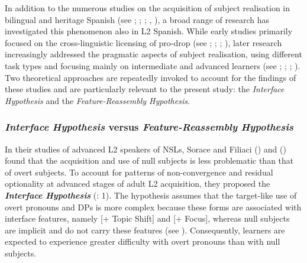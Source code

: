\documentclass[
  letterpaper,
  DIV=11,
  numbers=noendperiod]{scrartcl}
\begin{document}
In addition to the numerous studies on the acquisition of subject
realisation in bilingual and heritage Spanish (see
;
;
;
,
), a broad range of research has
investigated this phenomenon also in L2 Spanish. While early studies
primarily focused on the cross-linguistic licensing of pro-drop (see
;
;
;
),
later research increasingly addressed the pragmatic aspects of subject
realisation, using different task types and focusing mainly on
intermediate and advanced learners (see
;
;
;
). Two theoretical
approaches are repeatedly invoked to account for the findings of these
studies and are particularly relevant to the present study: the
\emph{Interface Hypothesis} and the \emph{Feature-Reassembly
Hypothesis}.

\subsubsection{\texorpdfstring{\emph{Interface} \emph{Hypothesis} versus
\emph{Feature-Reassembly}
\emph{Hypothesis}}{Interface Hypothesis versus Feature-Reassembly Hypothesis}}\label{sec-InterfaceHypothesis}

In their studies of advanced L2 speakers of NSLs, Sorace and Filiaci
() and
() found that
the acquisition and use of null subjects is less problematic than that
of overt subjects. To account for patterns of non-convergence and
residual optionality at advanced stages of adult L2 acquisition, they
proposed the \textbf{\emph{Interface Hypothesis}}
(: 1). The hypothesis assumes
that the target-like use of overt pronouns and DPs is more complex
because these forms are associated with interface features, namely {[}+
Topic Shift{]} and {[}+ Focus{]}, whereas null subjects are implicit and
do not carry these features (see ). Consequently, learners are expected to experience
greater difficulty with overt pronouns than with null subjects.
\end{document}
